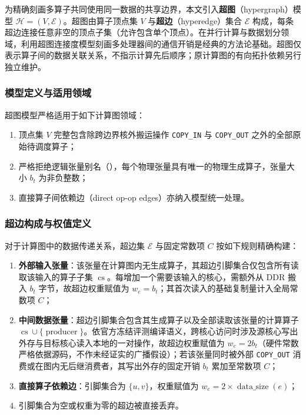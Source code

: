 \documentclass[anonymous,notoc]{gmcm2026}
\providecommand{\tightlist}{\setlength{\itemsep}{0pt}\setlength{\parskip}{0pt}}
\begin{document}
为精确刻画多算子共同使用同一数据的共享边界，本文引入\textbf{超图}（hypergraph）模型 \(\mathcal{H} = (V, \mathcal{E})\)。超图由算子顶点集 \(V\) 与\textbf{超边}（hyperedge）集合 \(\mathcal{E}\) 构成，每条超边连接任意非空的顶点子集（允许包含单个顶点）\cite{ref5}。在并行计算与数据划分领域，利用超图连接度模型刻画多处理器间的通信开销是经典的方法论基础\cite{ref3}。超图仅表示算子间的数据关联关系，不指示计算先后顺序；原计算图的有向拓扑依赖另行独立维护。

\subsubsection{模型定义与适用领域}

超图模型严格适用于如下计算图领域：

\begin{enumerate}
\def\labelenumi{\arabic{enumi}.}
\tightlist
\item
  顶点集 \(V\) 完整包含除跨边界核外搬运操作 \texttt{COPY\_IN} 与 \texttt{COPY\_OUT} 之外的全部原始待调度算子；
\item
  严格拒绝逻辑张量别名（\texttt{}），每个物理张量具有唯一的物理生成算子，张量大小 \(b_t\) 为非负整数；
\item
  直接算子间依赖边（direct op-op edges）亦纳入模型统一处理。
\end{enumerate}

\subsubsection{超边构成与权值定义}

对于计算图中的数据传递关系，超边集 \(\mathcal{E}\) 与固定常数项 \(C\) 按如下规则精确构建：

\begin{enumerate}
\def\labelenumi{\arabic{enumi}.}
\tightlist
\item
  \textbf{外部输入张量}：该张量在计算图内无生成算子，其超边引脚集合仅包含所有读取该输入的算子子集 \(\operatorname{cs}\)。每增加一个需要该输入的核心，需额外从 DDR 搬入 \(b_t\) 字节，故超边权重赋值为 \(w_e = b_t\)；其首次读入的基础复制量计入全局常数项 \(C\)；
\item
  \textbf{中间数据张量}：超边引脚集合包含其生成算子以及全部读取该张量的计算算子 \(\operatorname{cs} \cup \{\operatorname{producer}\}\)。依官方冻结评测编译语义，跨核心访问时涉及源核心写出外存与目标核心读入本地的一对操作，故超边权重赋值为 \(w_e = 2b_t\)（硬件常数严格依据源码，不作未经证实的广播假设）；若该张量同时被外部 \texttt{COPY\_OUT} 消费或在图内无后继消费者，其写出外存的固定开销 \(b_t\) 累加至常数项 \(C\)；
\item
  \textbf{直接算子依赖边}：引脚集合为 \(\{u, v\}\)，权重赋值为 \(w_e = 2 \times \operatorname{data\_size}(e)\)；
\item
  引脚集合为空或权重为零的超边被直接丢弃。
\end{enumerate}
\end{document}
